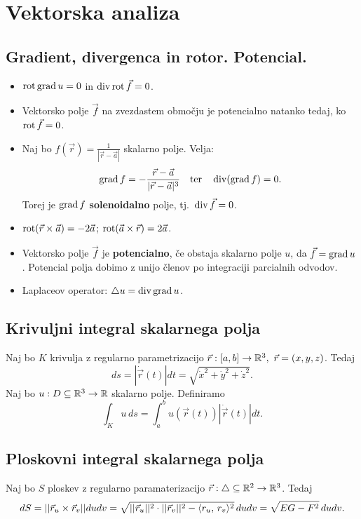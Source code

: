\section{Vektorska analiza}
\subsection{Gradient, divergenca in rotor. Potencial.}
\begin{itemize}
    \item \(\operatorname{rot} \operatorname{grad} u = 0\) in \(\operatorname{div} \operatorname{rot} \vec{f} = 0\).
    \item Vektorsko polje \(\vec{f}\) na zvezdastem območju je potencialno natanko tedaj, ko \(\operatorname{rot} \vec{f} = 0\).
    \item Naj bo \(f(\vec{r}) = \frac{1}{|\vec{r} - \vec{a}|}\) skalarno polje. Velja:
    \[
        \operatorname{grad} f = - \frac{\vec{r} - \vec{a}}{|\vec{r} - \vec{a}|^3} \quad \text{ter} \quad \operatorname{div} (\operatorname{grad} f) = 0.
    \]
    Torej je \(\operatorname{grad} f\) \textbf{solenoidalno} polje, tj.\ \(\operatorname{div} \vec{f} = 0\).
    \item \(\operatorname{rot} (\vec{r} \times \vec{a}) = - 2 \vec{a}\); \(\operatorname{rot} (\vec{a} \times \vec{r}) = 2 \vec{a}\).
    \item Vektorsko polje \(\vec{f}\) je \textbf{potencialno}, če obstaja skalarno polje \(u\), da \(\vec{f} = \operatorname{grad} u\). Potencial polja dobimo z unijo členov po integraciji parcialnih odvodov.
    \item Laplaceov operator: \(\triangle u = \operatorname{div} \operatorname{grad} u\).
\end{itemize}

\subsection{Krivuljni integral skalarnega polja}
Naj bo \(K\) krivulja z regularno parametrizacijo \(\vec{r}: [a,b] \to \mathbb{R}^3, \ \vec{r} = (x, y, z)\). Tedaj 
\[
    ds = |\dot{\vec{r}}(t)| dt = \sqrt{\dot{x}^2 + \dot{y}^2 + \dot{z}^2}.
\]
Naj bo \(u: D \subseteq \mathbb{R}^3 \to \mathbb{R}\) skalarno polje. Definiramo 
\[
    \int_{K} u \, ds = \int_{a}^{b} u(\vec{r}(t)) |\dot{\vec{r}}(t)| dt.
\]

\subsection{Ploskovni integral skalarnega polja}
Naj bo \(S\) ploskev z regularno paramaterizacijo \(\vec{r}: \triangle \subseteq \mathbb{R}^2 \to \mathbb{R}^3\).  Tedaj
\[
    dS = ||\vec{r}_u \times \vec{r}_v|| dudv = \sqrt{||\vec{r}_u||^2 \cdot ||\vec{r}_v||^2 - \langle r_u, \, r_v \rangle^2} \, dudv = \sqrt{EG-F^2} \, dudv.
\]

